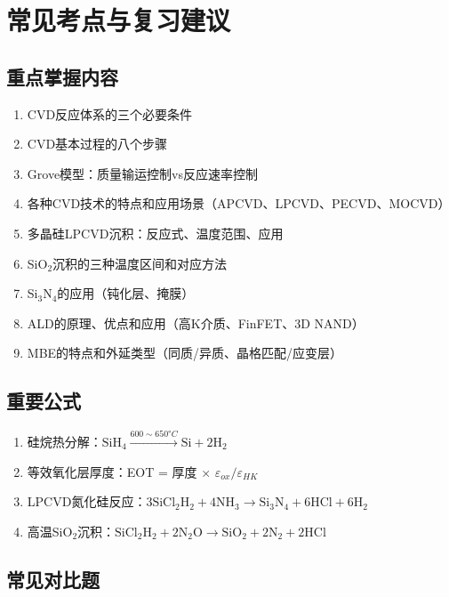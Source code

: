 \documentclass[UTF8,12pt,a4paper]{ctexart}
\begin{document}
\newpage

\section{常见考点与复习建议}

\subsection{重点掌握内容}

\begin{enumerate}
    \item CVD反应体系的三个必要条件
    \item CVD基本过程的八个步骤
    \item Grove模型：质量输运控制vs反应速率控制
    \item 各种CVD技术的特点和应用场景（APCVD、LPCVD、PECVD、MOCVD）
    \item 多晶硅LPCVD沉积：反应式、温度范围、应用
    \item SiO$_2$沉积的三种温度区间和对应方法
    \item Si$_3$N$_4$的应用（钝化层、掩膜）
    \item ALD的原理、优点和应用（高K介质、FinFET、3D NAND）
    \item MBE的特点和外延类型（同质/异质、晶格匹配/应变层）
\end{enumerate}

\subsection{重要公式}

\begin{enumerate}
    \item 硅烷热分解：$\text{SiH}_4 \xrightarrow{600\sim650°C} \text{Si} + 2\text{H}_2$
    \item 等效氧化层厚度：EOT = 厚度 $\times$ $\varepsilon_{ox}/\varepsilon_{HK}$
    \item LPCVD氮化硅反应：$3\text{SiCl}_2\text{H}_2 + 4\text{NH}_3 \rightarrow \text{Si}_3\text{N}_4 + 6\text{HCl} + 6\text{H}_2$
    \item 高温SiO$_2$沉积：$\text{SiCl}_2\text{H}_2 + 2\text{N}_2\text{O} \rightarrow \text{SiO}_2 + 2\text{N}_2 + 2\text{HCl}$
\end{enumerate}

\subsection{常见对比题}
\end{document}
